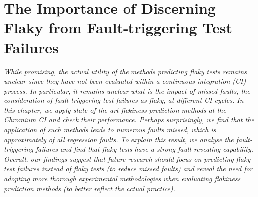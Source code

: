 \chapter{The Importance of Discerning Flaky from Fault-triggering Test Failures}
\label{chap:chromium}

\setcounter{minitocdepth}{1}
\justifying
\textit{While promising, the actual utility of the methods predicting flaky tests remains unclear since they have not been evaluated within a continuous integration (CI) process. In particular, it remains unclear what is the impact of missed faults, \ie the consideration of fault-triggering test failures as flaky, at different CI cycles. In this chapter, we apply state-of-the-art flakiness prediction methods at the Chromium CI and check their performance. Perhaps surprisingly, we find that the application of such methods leads to numerous faults missed, which is approximately  of all regression faults. To explain this result, we analyse the fault-triggering failures and find that flaky tests have a strong fault-revealing capability. Overall, our findings suggest that future research should focus on predicting flaky test failures instead of flaky tests (to reduce missed faults) and reveal the need for adopting more thorough experimental methodologies when evaluating flakiness prediction methods (to better reflect the actual practice).\\
}









